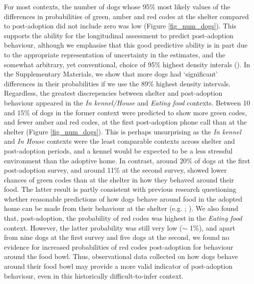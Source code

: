 \documentclass[12pt]{article}
\begin{document}
For most contexts, the number of dogs whose 95\% most likely values of the differences in probabilities of green, amber and red codes at the shelter compared to post-adoption did not include zero was low (Figure \ref{fig_num_dogs}). This supports the ability for the longitudinal assessment to predict post-adoption behaviour, although we emphasise that this good predictive ability is in part due to the appropriate representation of uncertainty in the estimates, and the somewhat arbitrary, yet conventional, choice of 95\% highest density interals (\cite{mcelreath2020}). In the Supplementary Materials, we show that more dogs had `significant' differences in their probabilities if we use the 89\% highest density intervals. Regardless, the greatest discrepencies between shelter and post-adoption behaviour appeared in the \textit{In kennel/House} and \textit{Eating food} contexts. Between 10 and 15\% of dogs in the former context were predicted to show more green codes, and fewer amber and red codes, at the first post-adoption phone call than at the shelter (Figure \ref{fig_num_dogs}). This is perhaps unsurprising as the \textit{In kennel} and \textit{In House} contexts were the least comparable contexts across shelter and post-adoption periods, and a kennel would be expected to be a less stressful environment than the adoptive home. In contrast, around 20\% of dogs at the first post-adoption survey, and around 11\% at the second survey, showed lower chances of green codes than at the shelter in how they behaved around their food. The latter result is partly consistent with previous research questioning whether reasonable predictions of how dogs behave around food in the adopted home can be made from their behaviour at the shelter (e.g. \cite{marder2013}; \cite{mohangibbons2012}). We also found that, post-adoption, the probability of red codes was highest in the \textit{Eating food} context. However, the latter probability was still very low ($\sim$ 1\%), and apart from nine dogs at the first survey and five dogs at the second, we found no evidence for increased probabilities of red codes post-adoption for behaviour around the food bowl. Thus, observational data collected on how dogs behave around their food bowl may provide a more valid indicator of post-adoption behaviour, even in this historically difficult-to-infer context.
\end{document}
